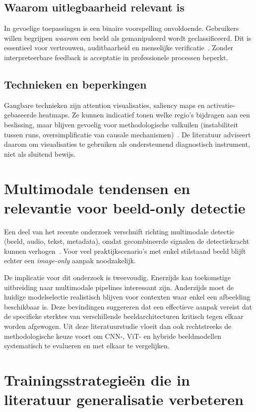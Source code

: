 \subsection{Waarom uitlegbaarheid relevant is}
In gevoelige toepassingen is een binaire voorspelling onvoldoende. Gebruikers willen begrijpen \emph{waarom} een beeld als gemanipuleerd wordt geclassificeerd. Dit is essentieel voor vertrouwen, auditbaarheid en menselijke verificatie~\autocite{SIDA2025}. Zonder interpreteerbare feedback is acceptatie in professionele processen beperkt.

\subsection{Technieken en beperkingen}
Gangbare technieken zijn attention visualisaties, saliency maps en activatie-gebaseerde heatmaps. Ze kunnen indicatief tonen welke regio's bijdragen aan een beslissing, maar blijven gevoelig voor methodologische valkuilen (instabiliteit tussen runs, oversimplificatie van causale mechanismen)~\autocite{SIDA2025}. De literatuur adviseert daarom om visualisaties te gebruiken als ondersteunend diagnostisch instrument, niet als sluitend bewijs.

\section{Multimodale tendensen en relevantie voor beeld-only detectie}
Een deel van het recente onderzoek verschuift richting multimodale detectie (beeld, audio, tekst, metadata), omdat gecombineerde signalen de detectiekracht kunnen verhogen~\autocite{MultimodalSurvey2025,CAST2025}. Voor veel praktijkscenario's met enkel stilstaand beeld blijft echter een \emph{image-only} aanpak noodzakelijk.

De implicatie voor dit onderzoek is tweevoudig. Enerzijds kan toekomstige uitbreiding naar multimodale pipelines interessant zijn. Anderzijds moet de huidige modelselectie realistisch blijven voor contexten waar enkel een afbeelding beschikbaar is. Deze bevindingen suggereren dat een effectieve aanpak vereist dat de specifieke sterktes van verschillende beeldarchitecturen kritisch tegen elkaar worden afgewogen. Uit deze literatuurstudie vloeit dan ook rechtstreeks de methodologische keuze voort om CNN-, ViT- en hybride beeldmodellen systematisch te evalueren en met elkaar te vergelijken.
\section{Trainingsstrategieën die in literatuur generalisatie verbeteren}

